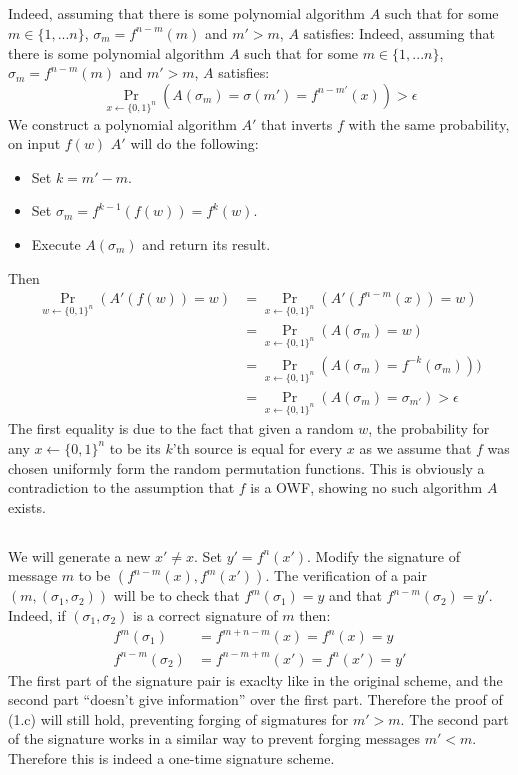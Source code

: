 \documentclass{article}
\begin{document}
\subsection{}%
Indeed, assuming that there is some polynomial algorithm $A$ such that for some $m\in\{1,...n\}$, $\sigma_m = f^{n-m}(m)$ and $m'>m$, $A$ satisfies:
Indeed, assuming that there is some polynomial algorithm $A$ such that for some $m\in\{1,...n\}$, $\sigma_m = f^{n-m}(m)$ and $m'>m$, $A$ satisfies:
\[\Pr_{x\leftarrow \{0,1\}^n}(A(\sigma_m) = \sigma(m') = f^{n-m'}(x)) > \epsilon\]
We construct a polynomial algorithm $A'$ that inverts $f$ with the same probability, on input $f(w)$ $A'$ will do the following:
\begin{itemize}
\item Set $k = m' - m$.
\item Set $\sigma_m = f^{k-1}(f(w)) = f^k(w)$.
\item Execute $A(\sigma_m)$ and return its result.
\end{itemize}
Then
\begin{align*}
\Pr_{w\leftarrow \{0,1\}^n}(A'(f(w)) = w) &= \Pr_{x\leftarrow \{0,1\}^n}(A'(f^{n-m}(x)) = w) \\
&= \Pr_{x\leftarrow \{0,1\}^n}(A(\sigma_m) = w)\\
&= \Pr_{x\leftarrow \{0,1\}^n}(A(\sigma_m) =  f^{-k}(\sigma_m)))\\
&= \Pr_{x\leftarrow \{0,1\}^n}(A(\sigma_m)  = \sigma_{m'}) > \epsilon
\end{align*}
The first equality is due to the fact that given a random $w$, the probability for any $x\leftarrow \{0,1\}^n$ to be its $k$'th source is equal for every $x$ as we assume that $f$ was chosen uniformly form the random permutation functions.
This is obviously a contradiction to the assumption that $f$ is a OWF, showing no such algorithm $A$ exists.

\subsection{}%
We will generate a new $x'\neq x$. Set $y'=f^{n}(x')$. Modify the
signature of message $m$ to be $\left(f^{n-m}(x),f^{m}(x')\right)$.
The verification of a pair $\left(m,\left(\sigma_{1},\sigma_{2}\right)\right)$
will be to check that $f^{m}(\sigma_{1})=y$ and that $f^{n-m}(\sigma_{2})=y'$.
Indeed, if $\left(\sigma_{1},\sigma_{2}\right)$ is a correct signature
of $m$ then:
\begin{align*}
f^{m}(\sigma_{1}) & =f^{m+n-m}(x)=f^{n}(x)=y\\
f^{n-m}(\sigma_{2}) & =f^{n-m+m}(x')=f^{n}(x')=y'
\end{align*}
The first part of the signature pair is exaclty like in the original
scheme, and the second part ``doesn't give information'' over the
first part. Therefore the proof of (1.c) will still hold, preventing
forging of sigmatures for $m'>m$. The second part of the signature
works in a similar way to prevent forging messages $m'<m$. Therefore
this is indeed a one-time signature scheme.
\end{document}
